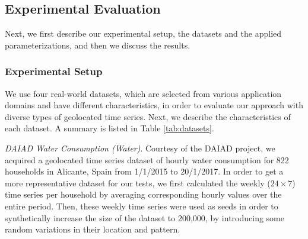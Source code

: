 \subsection{Experimental Evaluation}
\label{sec:evaluation}

\begin{table}[!b]
	\centering
	\caption{Datasets used in the experiments.}
	\vspace{-10pt}
	\begin{small}
	\centering
	\end{small}
	\label{tab:datasets}
\end{table}


%


Next, we first describe our experimental setup, the datasets and the applied parameterizations, and then we discuss the results.

\subsubsection{Experimental Setup}
\label{subsec:evaluation_setup}


We use four real-world datasets, which are selected from various application domains and have different characteristics, in order to evaluate our approach with diverse types of geolocated time series. Next, we describe the characteristics of each dataset. A summary is listed in Table \ref{tab:datasets}.

\emph{DAIAD Water Consumption (Water)}. Courtesy of the DAIAD project, we acquired a geolocated time series dataset of hourly water consumption for 822 households in Alicante, Spain from 1/1/2015 to 20/1/2017. In order to get a more representative dataset for our tests, we first calculated the weekly  ($24 \times 7$) time series per household by averaging corresponding hourly values over the entire period. Then, these weekly time series were used as seeds in order to synthetically increase the size of the dataset to 200,000, by introducing some random variations in their location and pattern.


